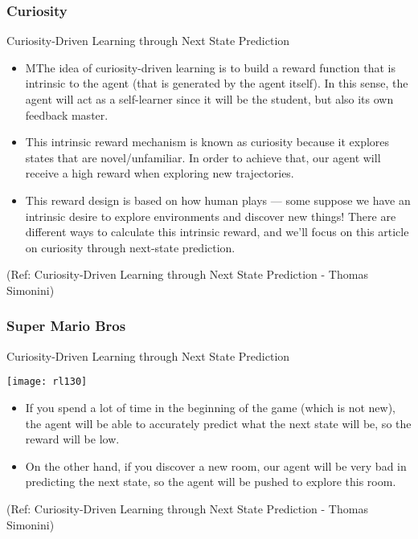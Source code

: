 \begin{frame}[fragile]\frametitle{Curiosity}
Curiosity-Driven Learning through Next State Prediction


\begin{itemize}
\item MThe idea of curiosity-driven learning is to build a reward function that is intrinsic to the agent (that is generated by the agent itself). In this sense, the agent will act as a self-learner since it will be the student, but also its own feedback master.
\item This intrinsic reward mechanism is known as curiosity because it explores states that are novel/unfamiliar. In order to achieve that, our agent will receive a high reward when exploring new trajectories.
\item This reward design is based on how human plays — some suppose we have an intrinsic desire to explore environments and discover new things! There are different ways to calculate this intrinsic reward, and we’ll focus on this article on curiosity through next-state prediction.
\end{itemize}

{\tiny (Ref: Curiosity-Driven Learning through Next State Prediction - Thomas Simonini)}


\end{frame}


\begin{frame}[fragile]\frametitle{Super Mario Bros}
Curiosity-Driven Learning through Next State Prediction

\begin{center}
\texttt{[image: rl130]}
\end{center}

\begin{itemize}
\item If you spend a lot of time in the beginning of the game (which is not new), the agent will be able to accurately predict what the next state will be, so the reward will be low.
\item  On the other hand, if you discover a new room, our agent will be very bad in predicting the next state, so the agent will be pushed to explore this room.
\end{itemize}

{\tiny (Ref: Curiosity-Driven Learning through Next State Prediction - Thomas Simonini)}


\end{frame}

